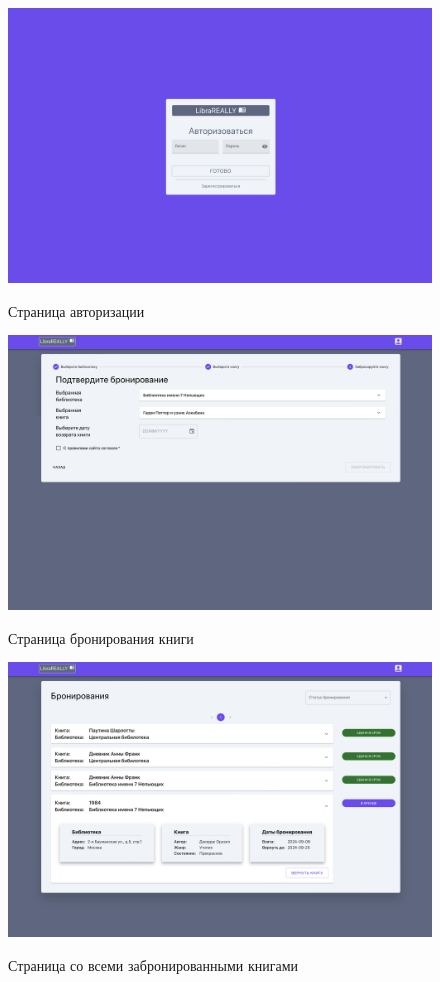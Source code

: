 \begin{figure}[H]
	\begin{center}
		{\includegraphics[scale = 0.25]{../img/design/login.png}}
		\caption{Страница авторизации}
		\label{fig:design-auth}
	\end{center}
\end{figure} 

\begin{figure}[H]
	\begin{center}
		{\includegraphics[scale = 0.25]{../img/design/reserv.png}}
		\caption{Страница бронирования книги}
		\label{fig:design-reserv}
	\end{center}
\end{figure}

\begin{figure}[H]
	\begin{center}
		{\includegraphics[scale = 0.25]{../img/design/all-reservs.png}}
		\caption{Страница со всеми забронированными книгами}
		\label{fig:design-reserv}
	\end{center}
\end{figure}
